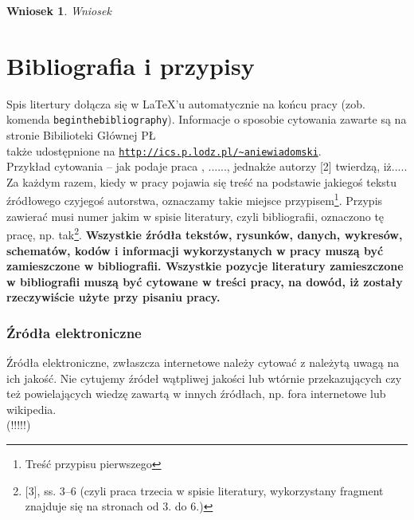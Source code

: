 \documentclass[12pt]{report}
\newtheorem{corollary}{Wniosek}[chapter] %
\begin{document}
\begin{corollary}
Wniosek
\end{corollary}
\section{Bibliografia i przypisy}
Spis litertury dołącza się  w \LaTeX'u automatycznie na końcu pracy (zob.
komenda {\tt begin{thebibliography}}). Informacje o sposobie cytowania zawarte
są na stronie Bibilioteki Głównej PŁ\\ także udostępnione na
\underline{\tt http://ics.p.lodz.pl/\textasciitilde aniewiadomski}. \\

\indent Przykład cytowania --  jak podaje praca \cite{kacprzyk86}, ......,
jednakże autorzy [2] twierdzą, iż.....\\


\indent Za każdym razem, kiedy w pracy pojawia się treść na podstawie jakiegoś
tekstu źródłowego czyjegoś autorstwa, oznaczamy takie miejsce
przypisem\footnote{Treść przypisu pierwszego}. Przypis zawierać musi  numer
jakim w spisie literatury, czyli bibliografii, oznaczono tę pracę, np.
tak\footnote{[3], ss. 3--6 (czyli praca trzecia w spisie literatury,
wykorzystany fragment znajduje się na stronach od 3. do 6.)}. {\bf
Wszystkie źródła tekstów, rysunków, danych, wykresów, schematów, kodów i
informacji wykorzystanych w pracy muszą być zamieszczone w bibliografii.
Wszystkie pozycje literatury zamieszczone w bibliografii muszą być cytowane w
treści pracy, na dowód, iż zostały rzeczywiście użyte przy pisaniu pracy.}

\subsubsection{Źródła elektroniczne}
Źródła elektroniczne, zwłaszcza internetowe należy cytować z należytą uwagą na
ich jakość. Nie cytujemy źródeł wątpliwej jakości lub wtórnie przekazujących
czy też powielających wiedzę zawartą w innych źródłach, np. fora internetowe lub
wikipedia.\\
 (!!!!!)
\end{document}
